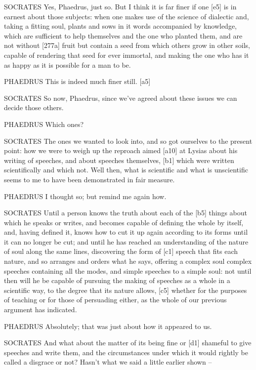 SOCRATES Yes, Phaedrus, just so. But I think it is far finer if one
{[}e5{]} is in earnest about those subjects: when one makes use of the
science of dialectic and, taking a fitting soul, plants and sows in it
words accompanied by knowledge, which are sufficient to help themselves
and the one who planted them, and are not without {[}277a{]} fruit but
contain a seed from which others grow in other soils, capable of
rendering that seed for ever immortal, and making the one who has it as
happy as it is possible for a man to be.

PHAEDRUS This is indeed much finer still. {[}a5{]}

SOCRATES So now, Phaedrus, since we've agreed about these issues we can
decide those others.

PHAEDRUS Which ones?

SOCRATES The ones we wanted to look into, and so got ourselves to the
present point: how we were to weigh up the reproach aimed {[}a10{]} at
Lysias about his writing of speeches, and about speeches themselves,
{[}b1{]} which were written scientifically and which not. Well then,
what is scientific and what is unscientific seems to me to have been
demonstrated in fair measure.

PHAEDRUS I thought so; but remind me again how.

SOCRATES Until a person knows the truth about each of the {[}b5{]}
things about which he speaks or writes, and becomes capable of defining
the whole by itself, and, having defined it, knows how to cut it up
again according to its forms until it can no longer be cut; and until he
has reached an understanding of the nature of soul along the same lines,
discovering the form of {[}c1{]} speech that fits each nature, and so
arranges and orders what he says, offering a
complex soul complex
speeches containing all the modes, and simple speeches to a simple soul:
not until then will he be capable of pursuing the making of speeches as
a whole in a scientific way, to the degree that its nature allows,
{[}c5{]} whether for the purposes of teaching or for those of persuading
either, as the whole of our previous argument has indicated.

PHAEDRUS Absolutely; that was just about how it appeared to us.

SOCRATES And what about the matter of its being fine or {[}d1{]}
shameful to give speeches and write them, and the circumstances under
which it would rightly be called a disgrace or not? Hasn't what we said
a little earlier shown --

